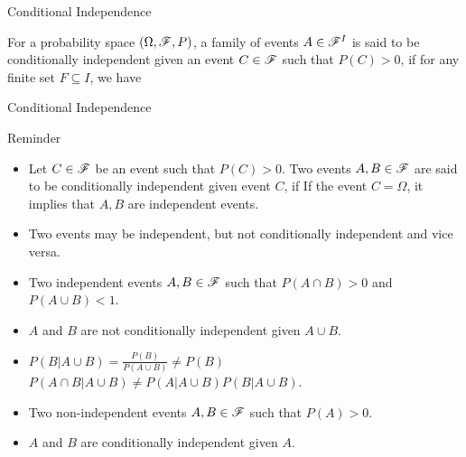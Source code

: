 \documentclass[12pt,aspectratio=169]{beamer}
\begin{document}
\begin{frame}{Conditional Independence}
\begin{Definition}
For a probability space $(\Omega, \mathscr{F}, P)$, a family of events $A \in \mathscr{F}^I$ is said to be conditionally independent given an event $C \in \mathscr{F}$ such that $P(C) > 0$, 
if for any finite set $F \subseteq I$, we have 
\end{Definition}
\end{frame}
\begin{frame}{Conditional Independence}
\begin{block}{Reminder}
\begin{itemize}

\item <1-> Let $C \in \mathscr{F}$ be an event such that $P(C) > 0$. 
Two events $A, B \in \mathscr{F}$ are said to be conditionally independent given event $C$, if 
If the event $C = \Omega$, it implies that $A, B$ are independent events. 

\item <2-> Two events may be independent, but not conditionally independent and vice versa. 
\end{itemize}
\end{block}
\end{frame}
\begin{frame}
\begin{Example}
\begin{itemize}
\item <1-> Two independent events $A, B \in \mathscr{F}$ such that $P(A\cap B) > 0$ and $P(A \cup B) < 1$. 
\item <2-> $A$ and $B$ are not conditionally independent given $A\cup B$.  
\item <3-> $P(B|A\cup B) = \frac{P(B)}{P(A\cup B)} \neq P(B)$ \implies $P(A \cap B | A\cup B) \neq P(A|A\cup B)P(B|A\cup B)$. 
\item <4-> Two non-independent events $A, B \in \mathscr{F}$ such that $P(A) > 0$. 
\item <5-> $A$ and $B$ are conditionally independent given $A$. 
\end{itemize}
\end{Example}
\end{frame}
\end{document}
